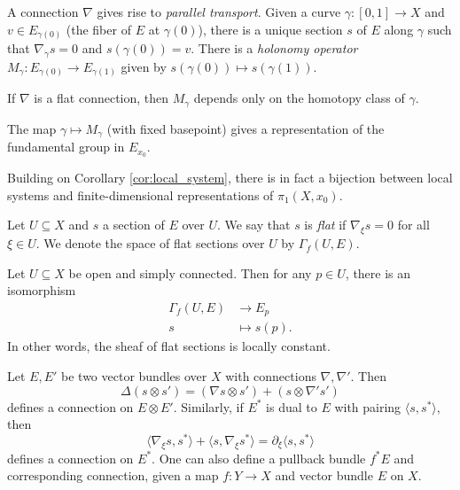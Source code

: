 \begin{remark}
  A connection $\nabla$ gives rise to
  \emph{parallel transport}. Given a
  curve $\gamma : [0, 1] \to X$ and
  $v \in E_{\gamma(0)}$ (the fiber of
  $E$ at $\gamma(0)$), there is a unique
  section $s$ of $E$ along $\gamma$ such that
  $\nabla_{\dot{\gamma}} s = 0$ and
  $s(\gamma(0)) = v$.
  There is a \emph{holonomy operator}
  $M_{\gamma} : E_{\gamma(0)} \to E_{\gamma(1)}$
  given by $s(\gamma(0)) \mapsto s(\gamma(1))$.
\end{remark}

\begin{theorem}
  If $\nabla$ is a flat connection, then
  $M_\gamma$ depends only on the homotopy
  class of $\gamma$.
\end{theorem}

\begin{corollary}\label{cor:local_system}
  The map
  $\gamma \mapsto M_\gamma$
  (with fixed basepoint) gives a
  representation of the fundamental group
  in $E_{x_0}$.
\end{corollary}

\begin{remark}
  Building on Corollary \ref{cor:local_system}, there is in fact
  a bijection
  between local systems and finite-dimensional
  representations of $\pi_1(X, x_0)$.
\end{remark}

\begin{definition}
  Let $U \subseteq X$ and $s$ a section
  of $E$ over $U$. We say that $s$ is
  \emph{flat} if
  $\nabla_\xi s = 0$ for all
  $\xi \in U$. We denote the space of
  flat sections over $U$ by
  $\Gamma_f(U, E)$.
\end{definition}

\begin{lemma}
  Let $U \subseteq X$ be open and
  simply connected. Then for any $p \in U$,
  there is an isomorphism
  \begin{align*}
    \Gamma_f(U, E)
    &\longrightarrow E_p \\
    s &\longmapsto s(p).
  \end{align*}
  In other words, the sheaf of flat sections is
  locally constant.
\end{lemma}

\begin{remark}
  Let $E, E'$ be two vector bundles
  over $X$ with connections
  $\nabla, \nabla'$. Then
  \[
    \Delta(s \otimes s')
    = (\nabla s \otimes s')
    + (s \otimes \nabla' s')
  \]
  defines a connection on $E \otimes E'$.
  Similarly, if $E^*$ is dual to $E$
  with pairing $\langle s, s^* \rangle$, then
  \[
    \langle \nabla_\xi s, s^* \rangle
    + \langle s, \nabla_\xi s^* \rangle
    = \partial_\xi \langle s, s^* \rangle
  \]
  defines a connection on $E^*$.
  One can also define a pullback bundle
  $f^* E$ and
  corresponding connection, given a map
  $f : Y \to X$ and vector bundle $E$ on $X$.
\end{remark}

